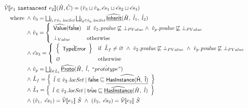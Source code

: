 \[
\renewcommand\arraystretch{1.5}
\begin{array}{l}

\aV \lbr e_1 ~\verb+instanceof+~ e_2 \rbr (\hat{H}, \hat{C}) 
= (\hat{v}_3 \sqcup \hat{v}_4, \hat{es}_1 \sqcup \hat{es}_2 \sqcup \hat{es}_3 )\\
\quad\wherec{
\land\ \hat{v}_3 = \bigsqcup_{\hat{l}_1 \in \hat{v}_1\emph{.locSet}} \bigsqcup_{\hat{l}_2 \in \hat{v}_p\emph{.locSet}}
\ahf{Inherit}(\hat{H},\ \hat{l}_1,\ \hat{l}_2) \\
\land\ \hat{v}_4 = \left \{ \begin{array}{ll}
\abs{Value}(\afalse) & \ifc{\hat{v}_2\emph{.pvalue} \not\sqsubseteq \bot_{PValue} 
\land\ \hat{v}_p\emph{.pvalue} \not\sqsubseteq \bot_{PValue}} \\
\bot_{Value} & \owc \\
\end{array} \right. \\
\land\ \hat{es}_3 = \left \{ \begin{array}{ll}
\set{\hat{\exc{TypeError}}} & \ifc{\hat{L}_f \neq \varnothing \
\land\ \hat{v}_2\emph{.pvalue} \not\sqsubseteq \bot_{PValue} \
\land\ \hat{v}_p\emph{.pvalue} \not\sqsubseteq \bot_{PValue} \\} \\
\varnothing & \owc \\
\end{array} \right. \\
\land\ \hat{v}_p = \bigsqcup_{\hat{l} \in \hat{L}_t} \ahf{Proto}(\hat{H},\ \hat{l},\ \hat{``prototype"}) \\
\land\ \hat{L}_f = \set{\hat{l} \in \hat{v}_2\emph{.locSet} \mid 
\afalse \sqsubseteq \ahf{HasInstance(\hat{H},\ \hat{l})} } \\
\land\ \hat{L}_t = \set{ \hat{l} \in \hat{v}_2\emph{.locSet} \mid 
\atrue \sqsubseteq \ahf{HasInstance}(\hat{H},\ \hat{l}) } \\
\land\ (\hat{v}_1,\ \hat{es}_1) = \aV \lbr e_1 \rbr\ \hat{S} \
\land\ (\hat{v}_2,\ \hat{es}_2) = \aV \lbr e_2 \rbr\ \hat{S} \\
}\\\\


\end{array}\]
